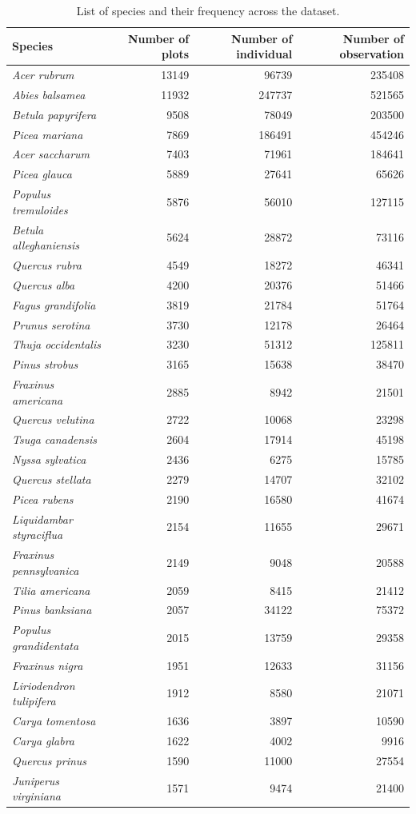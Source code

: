 \begin{longtable}{lrrr}
\caption{List of species and their frequency across the dataset.}
\label{variability_impl_mech}
\endfirsthead
\endhead
  \toprule
    Species & Number of
    plots & Number of
    individual & Number of
    observation \\
    \midrule\addlinespace[2.5pt]
    \emph{Acer rubrum} & 13149 & 96739 & 235408 \\
    \emph{Abies balsamea} & 11932 & 247737 & 521565 \\
    \emph{Betula papyrifera} & 9508 & 78049 & 203500 \\
    \emph{Picea mariana} & 7869 & 186491 & 454246 \\
    \emph{Acer saccharum} & 7403 & 71961 & 184641 \\
    \emph{Picea glauca} & 5889 & 27641 & 65626 \\
    \emph{Populus tremuloides} & 5876 & 56010 & 127115 \\
    \emph{Betula alleghaniensis} & 5624 & 28872 & 73116 \\
    \emph{Quercus rubra} & 4549 & 18272 & 46341 \\
    \emph{Quercus alba} & 4200 & 20376 & 51466 \\
    \emph{Fagus grandifolia} & 3819 & 21784 & 51764 \\
    \emph{Prunus serotina} & 3730 & 12178 & 26464 \\
    \emph{Thuja occidentalis} & 3230 & 51312 & 125811 \\
    \emph{Pinus strobus} & 3165 & 15638 & 38470 \\
    \emph{Fraxinus americana} & 2885 & 8942 & 21501 \\
    \emph{Quercus velutina} & 2722 & 10068 & 23298 \\
    \emph{Tsuga canadensis} & 2604 & 17914 & 45198 \\
    \emph{Nyssa sylvatica} & 2436 & 6275 & 15785 \\
    \emph{Quercus stellata} & 2279 & 14707 & 32102 \\
    \emph{Picea rubens} & 2190 & 16580 & 41674 \\
    \emph{Liquidambar styraciflua} & 2154 & 11655 & 29671 \\
    \emph{Fraxinus pennsylvanica} & 2149 & 9048 & 20588 \\
    \emph{Tilia americana} & 2059 & 8415 & 21412 \\
    \emph{Pinus banksiana} & 2057 & 34122 & 75372 \\
    \emph{Populus grandidentata} & 2015 & 13759 & 29358 \\
    \emph{Fraxinus nigra} & 1951 & 12633 & 31156 \\
    \emph{Liriodendron tulipifera} & 1912 & 8580 & 21071 \\
    \emph{Carya tomentosa} & 1636 & 3897 & 10590 \\
    \emph{Carya glabra} & 1622 & 4002 & 9916 \\
    \emph{Quercus prinus} & 1590 & 11000 & 27554 \\
    \emph{Juniperus virginiana} & 1571 & 9474 & 21400 \\
  \bottomrule
\end{longtable}

